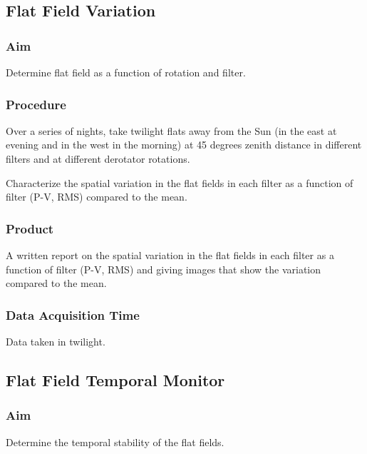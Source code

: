 \documentclass{article}
\begin{document}
\subsection{Flat Field Variation}

\subsubsection{Aim}

Determine flat field as a function of rotation and filter.

\subsubsection{Procedure}

Over a series of nights, take twilight flats away from the Sun (in the east at evening and in the west in the morning) at 45 degrees zenith distance in different filters and at different derotator rotations.

Characterize the spatial variation in the flat fields in each filter as a function of filter (P-V, RMS) compared to the mean.

\subsubsection{Product}

A written report on the spatial variation in the flat fields in each filter as a function of filter (P-V, RMS) and giving images that show the variation compared to the mean.

\subsubsection{Data Acquisition Time}

Data taken in twilight.


\subsection{Flat Field Temporal Monitor}

\subsubsection{Aim}

Determine the temporal stability of the flat fields.
\end{document}
